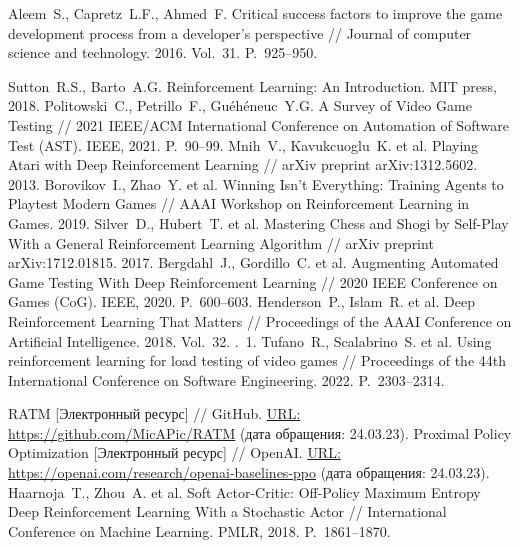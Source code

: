 \documentclass[a4paper,article,14pt]{extarticle}
\begin{document}
\begin{thebibliography}{1}
 Aleem~S., Capretz~L.F., Ahmed~F. Critical success factors to improve the game development process from a developer’s perspective // Journal of computer science and technology. 2016. Vol.~31. P.~925--950.

 Sutton~R.S., Barto~A.G. Reinforcement Learning: An Introduction. MIT press, 2018.
 Politowski~C., Petrillo~F., Gu{\'e}h{\'e}neuc~Y.\:G. A Survey of Video Game Testing // 2021 IEEE/ACM International Conference on Automation of Software Test (AST). IEEE, 2021. P.~90--99.
 Mnih~V., Kavukcuoglu~K. et al. Playing Atari with Deep Reinforcement Learning // arXiv preprint arXiv:1312.5602. 2013.
 Borovikov~I., Zhao~Y. et al. Winning Isn’t Everything: Training Agents to Playtest Modern Games // AAAI Workshop on Reinforcement Learning in Games. 2019.
 Silver~D., Hubert~T. et al. Mastering Chess and Shogi by Self-Play With a General Reinforcement Learning Algorithm // arXiv preprint arXiv:1712.01815. 2017.
 Bergdahl~J., Gordillo~C. et al. Augmenting Automated Game Testing With Deep Reinforcement Learning // 2020 IEEE Conference on Games (CoG). IEEE, 2020. P.~600--603.
 Henderson~P., Islam~R. et al. Deep Reinforcement Learning That Matters // Proceedings of the AAAI Conference on Artificial Intelligence. 2018. Vol.~32. \textnumero.~1.
 Tufano~R., Scalabrino~S. et al. Using reinforcement learning for load testing of video games // Proceedings of the 44th International Conference on Software Engineering. 2022. P.~2303--2314.

 RATM [Электронный ресурс] // GitHub. \url{URL: https://github.com/MicAPic/RATM} (дата обращения: 24.03.23).
 Proximal Policy Optimization [Электронный ресурс] // OpenAI. \url{URL: https://openai.com/research/openai-baselines-ppo} (дата обращения: 24.03.23).
 Haarnoja~T., Zhou~A. et al. Soft Actor-Critic: Off-Policy Maximum Entropy Deep Reinforcement Learning With a Stochastic Actor // International Conference on Machine Learning. PMLR, 2018. P.~1861--1870.

\end{thebibliography}
\end{document}

